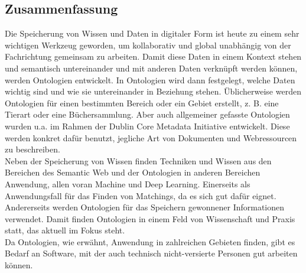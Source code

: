%
\pagestyle{empty}

\subsection*{Zusammenfassung}

Die Speicherung von Wissen und Daten in digitaler Form ist heute zu einem sehr
wichtigen Werkzeug geworden, um kollaborativ und global unabhängig von der
Fachrichtung gemeinsam zu arbeiten. Damit diese Daten in einem Kontext stehen
und semantisch untereinander und mit anderen Daten verknüpft werden können,
werden Ontologien entwickelt. In Ontologien wird dann festgelegt, welche Daten
wichtig sind und wie sie untereinander in Beziehung stehen. Üblicherweise werden
Ontologien für einen bestimmten Bereich oder ein Gebiet erstellt, z. B. eine
Tierart oder eine Büchersammlung. Aber auch allgemeiner gefasste Ontologien
wurden u.a. im Rahmen der Dublin Core Metadata Initiative  entwickelt. Diese
werden konkret dafür benutzt, jegliche Art von Dokumenten und Webressourcen zu beschreiben.\\
Neben der Speicherung von Wissen finden Techniken und Wissen aus den Bereichen
des Semantic Web und der Ontologien in anderen Bereichen Anwendung, allen voran
Machine und Deep Learning. Einerseits als Anwendungsfall für das Finden von
Matchings, da es sich gut dafür eignet. Andererseits werden Ontologien für das
Speichern gewonnener Informationen verwendet. Damit finden Ontologien in einem
Feld von Wissenschaft und Praxis statt, das aktuell im Fokus steht.\\
Da Ontologien, wie erwähnt, Anwendung in zahlreichen Gebieten finden, gibt es
Bedarf an Software, mit der auch technisch nicht-versierte Personen gut arbeiten
können.

